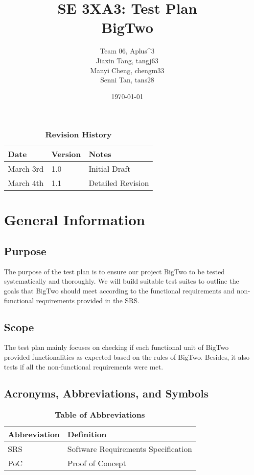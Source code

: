 \documentclass[12pt, titlepage]{article}
\title{SE 3XA3: Test Plan\\BigTwo}
\author{Team 06, Aplus^3
		\\ Jiaxin Tang, tangj63
		\\ Manyi Cheng, chengm33
		\\ Senni Tan, tans28
}
\date{\today}
\begin{document}
\maketitle

\tableofcontents
\listoftables
\listoffigures

\begin{table}[bp]
\caption{\bf Revision History}
\begin{tabularx}{\textwidth}{p{3cm}p{2cm}X}
\toprule {\bf Date} & {\bf Version} & {\bf Notes}\\
\midrule
March 3rd & 1.0 & Initial Draft\\
March 4th & 1.1 & Detailed Revision\\

\bottomrule
\end{tabularx}
\end{table}

\newpage


\section{General Information}

\subsection{Purpose}
The purpose of the test plan is to ensure our project BigTwo to be tested systematically and thoroughly. We will build suitable test suites to outline the goals that BigTwo should meet according to the functional requirements and non-functional requirements provided in the SRS.

\subsection{Scope}
The test plan mainly focuses on checking if each functional unit of BigTwo provided functionalities as expected based on the rules of BigTwo. Besides, it also tests if all the non-functional requirements were met.

\subsection{Acronyms, Abbreviations, and Symbols}
	
\begin{table}[hbp]
\caption{\textbf{Table of Abbreviations}} \label{Table}

\begin{tabularx}{\textwidth}{p{3cm}X}
\toprule
\textbf{Abbreviation} & \textbf{Definition} \\
\midrule
SRS & Software Requirements Specification\\
PoC & Proof of Concept\\
\bottomrule
\end{tabularx}

\end{table}
\end{document}
